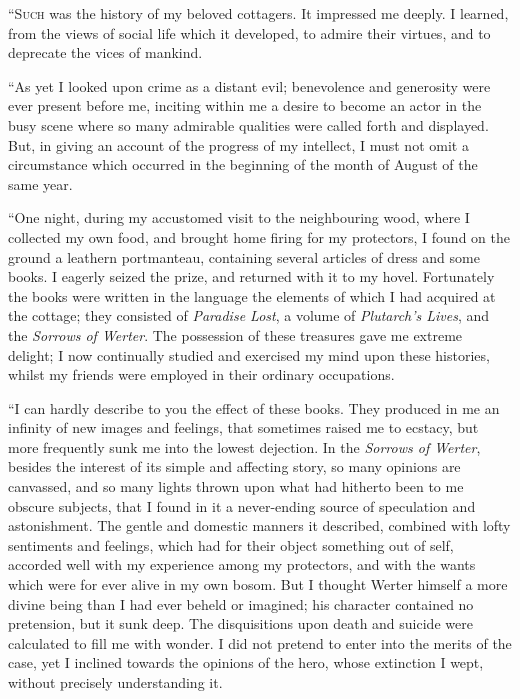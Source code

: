 
``\textsc{Such} was the history of my beloved
cottagers. It impressed me deeply. I
learned, from the views of social life
which it developed, to admire their virtues,
and to deprecate the vices of mankind.

``As yet I looked upon crime as a distant
evil; benevolence and generosity
were ever present before me, inciting
within me a desire to become an actor
in the busy scene where so many admirable
qualities were called forth and
displayed. But, in giving an account
of the progress of my intellect, I must
not omit a circumstance which occurred
in the beginning of the month of
August of the same year.

``One night, during my accustomed
visit to the neighbouring wood, where
I collected my own food, and brought
home firing for my protectors, I found
on the ground a leathern portmanteau,
containing several articles of dress and
some books. I eagerly seized the
prize, and returned with it to my hovel.
Fortunately the books were written in
the language the elements of which I
had acquired at the cottage; they consisted
of \emph{Paradise Lost}, a volume of
\emph{Plutarch's Lives}, and the \emph{Sorrows of
Werter}. The possession of these treasures
gave me extreme delight; I now
continually studied and exercised my
mind upon these histories, whilst my
friends were employed in their ordinary
occupations.

``I can hardly describe to you the
effect of these books. They produced
in me an infinity of new images and
feelings, that sometimes raised me to
ecstacy, but more frequently sunk me
into the lowest dejection. In the \emph{Sorrows
of Werter}, besides the interest of its
simple and affecting story, so many
opinions are canvassed, and so many
lights thrown upon what had hitherto
been to me obscure subjects, that I
found in it a never-ending source of
speculation and astonishment. The
gentle and domestic manners it described,
combined with lofty sentiments
and feelings, which had for their
object something out of self, accorded
well with my experience among my
protectors, and with the wants which
were for ever alive in my own bosom.
But I thought Werter himself a more
divine being than I had ever beheld or
imagined; his character contained no
pretension, but it sunk deep. The
disquisitions upon death and suicide
were calculated to fill me with wonder.
I did not pretend to enter into the merits
of the case, yet I inclined towards
the opinions of the hero, whose extinction
I wept, without precisely understanding
it.

